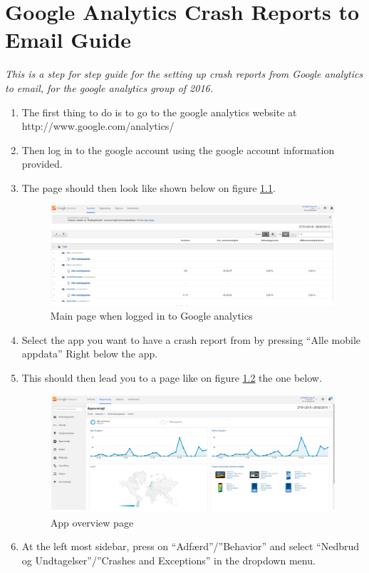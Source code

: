 \chapter{Google Analytics Crash Reports to Email Guide} \label{ChapCrashReport}
\textit{This is a step for step guide for the setting up crash reports from Google analytics to email, for the google analytics group of 2016.}

\begin{enumerate}
	\item The first thing to do is to go to the google analytics website at http://www.google.com/analytics/ 
	\item Then log in to the google account using the google account information provided.
	\item The page should then look like shown below on figure \ref{MainPage}.
		\begin{figure}[H]
			\includegraphics[width=0.8 \textwidth]{pictures/MainPage.png}
			\caption{Main page when logged in to Google analytics}
			\label{MainPage}
		\end{figure}
	\item Select the app you want to have a crash report from by pressing “Alle mobile appdata” Right below the app.
	\item This should then lead you to a page like on figure \ref{Appoversigt} the one below.
		\begin{figure}[H]
			\includegraphics[width=0.8 \textwidth]{pictures/Appoversigt.png}
			\caption{App overview page}
			\label{Appoversigt}
		\end{figure}
	\item At the left most sidebar, press on “Adfærd”/”Behavior” and select “Nedbrud og Undtagelser”/”Crashes and Exceptions” in the dropdown menu.

\end{enumerate}
